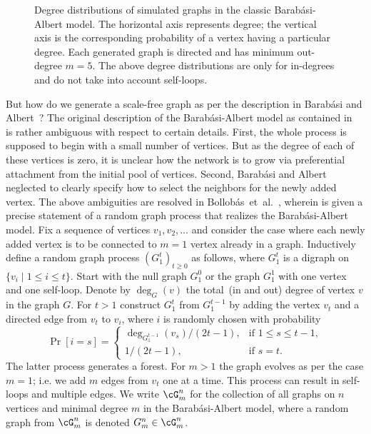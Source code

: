 \begin{figure}[!htbp]
\centering
{}

\caption{Degree distributions of simulated graphs in the classic
  Barab\'asi-Albert model. The horizontal axis represents degree; the
  vertical axis is the corresponding probability of a vertex having a
  particular degree. Each generated graph is directed and has
  minimum out-degree $m = 5$. The above degree distributions are only
  for in-degrees and do not take into account self-loops.}
\label{fig:random_graphs:simulated_scale_free_networks}
\end{figure}

But how do we generate a scale-free graph as per the description in
Barab\'asi and Albert~\cite{BarabasiAlbert1999}? The original
description of the Barab\'asi-Albert
model as contained in~\cite{BarabasiAlbert1999} is rather ambiguous
with respect to certain details. First, the whole process is supposed
to begin with a small number of vertices. But as the degree of each of
these vertices is zero, it is unclear how the network is to grow via
preferential attachment from the initial pool of vertices. Second,
Barab\'asi and Albert neglected to clearly specify how to select the
neighbors for the newly added vertex. The above ambiguities are
resolved in Bollob\'as~et~al.~\cite{BollobasEtAl2001}, wherein is given
a precise statement of a random graph process that realizes the
Barab\'asi-Albert model. Fix a sequence of vertices
$v_1, v_2, \dots$ and consider the case where each newly added vertex
is to be connected to $m = 1$ vertex already in a graph. Inductively
define a random graph process $(G_1^t)_{t \geq 0}$ as follows, where
$G_1^t$ is a digraph on $\{v_i \mid 1 \leq i \leq t\}$. Start with the
null graph $G_1^0$ or the graph $G_1^1$ with one
vertex and one self-loop. Denote by $\deg_G(v)$ the total~(in and out)
degree of vertex $v$ in the graph $G$. For $t > 1$ construct $G_1^t$
from $G_1^{t-1}$ by adding the vertex $v_t$ and a directed edge from
$v_t$ to $v_i$, where $i$ is randomly chosen with probability
\[
\Pr[i = s]
=
\begin{cases}
\deg_{G_1^{t-1}}(v_s) / (2t - 1), & \text{if $1 \leq s \leq t - 1$}, \\[4pt]
1 / (2t - 1), & \text{if $s = t$}.
\end{cases}
\]
The latter process generates a forest. For $m > 1$ the graph evolves
as per the case $m = 1$; i.e. we add $m$ edges from $v_t$ one at a
time. This process can result in self-loops and multiple edges. We
write $\cG_m^n$ for the collection of all graphs on $n$ vertices and
minimal degree $m$ in the Barab\'asi-Albert model, where a random
graph from $\cG_m^n$ is denoted $G_m^n \in \cG_m^n$.

